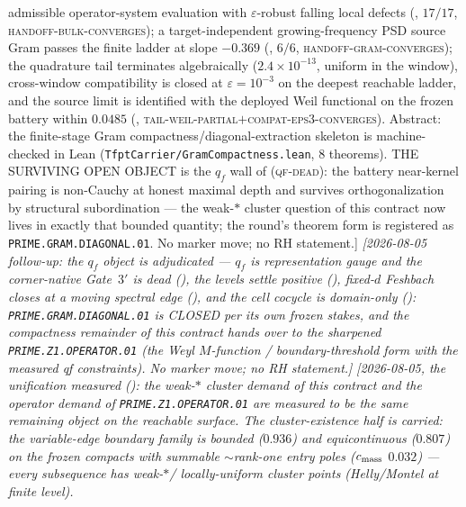 \documentclass[11pt,a4paper]{article}
\begin{document}
{{admissible operator-system evaluation with $\varepsilon$-robust
falling local defects (, $17/17$,
\textsc{handoff-bulk-converges}); a target-independent
growing-frequency PSD source Gram passes the finite ladder at slope
$-0.369$ (, $6/6$,
\textsc{handoff-gram-converges}); the quadrature tail terminates
algebraically ($2.4\times10^{-13}$, uniform in the window),
cross-window compatibility is closed at $\varepsilon=10^{-3}$ on the
deepest reachable ladder, and the source limit is identified with
the deployed Weil functional on the frozen battery within $0.0485$
(,
\textsc{tail-weil-partial}$+$\textsc{compat-eps3-converges}).
Abstract: the finite-stage Gram compactness/diagonal-extraction
skeleton is machine-checked in Lean
(\texttt{TfptCarrier/GramCompactness.lean}, $8$ theorems).  THE
SURVIVING OPEN OBJECT is the $q_f$ wall of
 (\textsc{qf-dead}): the battery
near-kernel pairing is non-Cauchy at honest maximal depth and
survives orthogonalization by structural subordination --- the
weak-$*$ cluster question of this contract now lives in exactly that
bounded quantity; the round's theorem form is registered as
\texttt{PRIME.GRAM.DIAGONAL.01}.  No marker move; no RH
statement.]}
\emph{[2026-08-05 follow-up: the $q_f$ object is adjudicated ---
$q_f$ is representation gauge and the corner-native Gate~$3'$ is
dead (), the levels settle
positive (), fixed-$d$
Feshbach closes at a moving spectral edge
(), and the cell cocycle is
domain-only ():
\texttt{PRIME.GRAM.DIAGONAL.01} is CLOSED per its own frozen
stakes, and the compactness remainder of this contract hands over
to the \emph{sharpened} \texttt{PRIME.Z1.OPERATOR.01} (the Weyl
$M$-function / boundary-threshold form with the measured qf
constraints).  No marker move; no RH statement.]}
\emph{[2026-08-05, the unification measured
(): the weak-$*$ cluster
demand of this contract and the operator demand of
\texttt{PRIME.Z1.OPERATOR.01} are measured to be the \emph{same}
remaining object on the reachable surface.  The cluster-existence
half is \emph{carried}: the variable-edge boundary family is
bounded ($0.936$) and equicontinuous ($0.807$) on the frozen
compacts with summable ${\sim}$rank-one entry poles
($c_{\rm mass}$ $0.032$) --- every subsequence has weak-$*$/%
locally-uniform cluster points (Helly/Montel at finite level).
}}
\end{document}
